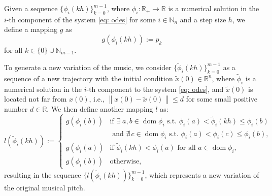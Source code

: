 \documentclass[11pt]{article}
\theoremstyle{definition}
\DeclareMathOperator{\dom}{dom}
\begin{document}
Given a sequence $\{\phi_i(kh)\}_{k=0}^{m-1}$, where $\phi_i:\mathbb{R}_+ \to \mathbb{R}$ is a numerical solution in the $i$-th component of the system \eqref{eq: odes} for some $i \in \mathbb{N}_n$ and a step size $h$, we define a mapping $g$ as
\begin{equation} \label{eq: gmap}
g(\phi_i(kh)) := p_k
\end{equation}
for all $k \in \{0\}\cup\mathbb{N}_{m-1}$.

To generate a new variation of the music, we consider $\{\tilde{\phi}_i(kh)\}_{k=0}^{m-1}$ as a sequence of a new trajectory with the initial condition $\tilde{x}(0) \in \mathbb{R}^n$, where $\tilde{\phi}_i$ is a numerical solution in the $i$-th component to the system \eqref{eq: odes}, and $\tilde{x}(0)$ is located not far from $x(0)$, i.e., $\left\lVert x(0) - \tilde{x}(0) \right\rVert \leq d$ for some small positive number $d \in \mathbb{R}$.
We then define another mapping $l$ as:
\begin{equation} \label{eq: lmap}
l(\tilde{\phi}_i(kh)) :=
\begin{cases}
g(\phi_i(b)) & \text{if } \exists\; a, b \in \dom{\phi_i} \text{ s.t. } \phi_i(a) < \tilde{\phi}_i(kh) \leq \phi_i(b) \\
& \text{ and } \nexists\, c \in \dom{\phi_i} \text{ s.t. } \phi_i(a) < \phi_i(c) \leq \phi_i(b), \\
g(\phi_i(a)) & \text{if } \tilde{\phi}_i(kh) < \phi_i(a) \text{ for all } a \in \dom{\phi_i}, \\
g(\phi_i(b)) & \text{otherwise},
\end{cases}
\end{equation}
resulting in the sequence $\{l(\tilde{\phi}_i(kh))\}_{k=0}^{m-1}$, which represents a new variation of the original musical pitch.
\end{document}

